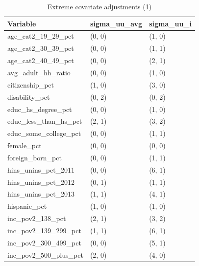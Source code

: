 \documentclass[12pt]{article}
\begin{document}
\begin{table}[ht]
\centering
\begin{tabular}{lll}
  \toprule
Variable & sigma\_uu\_avg & sigma\_uu\_i \\ 
  \midrule
age\_cat2\_19\_29\_pct & (0, 0) & (1, 0) \\ 
  age\_cat2\_30\_39\_pct & (0, 0) & (1, 1) \\ 
  age\_cat2\_40\_49\_pct & (0, 0) & (2, 1) \\ 
  avg\_adult\_hh\_ratio & (0, 0) & (1, 0) \\ 
  citizenship\_pct & (1, 0) & (3, 0) \\ 
  disability\_pct & (0, 2) & (0, 2) \\ 
  educ\_hs\_degree\_pct & (0, 0) & (1, 0) \\ 
  educ\_less\_than\_hs\_pct & (2, 1) & (3, 2) \\ 
  educ\_some\_college\_pct & (0, 0) & (1, 1) \\ 
  female\_pct & (0, 0) & (0, 0) \\ 
  foreign\_born\_pct & (0, 0) & (1, 1) \\ 
  hins\_unins\_pct\_2011 & (0, 0) & (6, 1) \\ 
  hins\_unins\_pct\_2012 & (0, 1) & (1, 1) \\ 
  hins\_unins\_pct\_2013 & (1, 1) & (4, 1) \\ 
  hispanic\_pct & (1, 0) & (1, 0) \\ 
  inc\_pov2\_138\_pct & (2, 1) & (3, 2) \\ 
  inc\_pov2\_139\_299\_pct & (1, 1) & (6, 1) \\ 
  inc\_pov2\_300\_499\_pct & (0, 0) & (5, 1) \\ 
  inc\_pov2\_500\_plus\_pct & (2, 0) & (4, 0) \\ 
   \bottomrule
\end{tabular}
    \caption{Extreme covariate adjustments (1)}
    \label{tab:extreme1}
\end{table}
\end{document}
